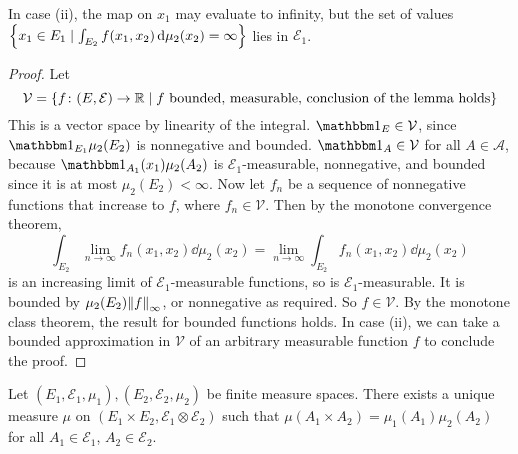 \begin{remark}
	In case (ii), the map on \( x_1 \) may evaluate to infinity, but the set of values \( \qty{x_1 \in E_1 \mid \int_{E_2} f(x_1,x_2) \dd{\mu_2(x_2)} = \infty} \) lies in \( \mathcal E_1 \).
\end{remark}
\begin{proof}
	Let
	\[ \mathcal V = \qty{f \colon (E,\mathcal E) \to \mathbb R \mid f \text{ bounded, measurable, conclusion of the lemma holds}} \]
	This is a vector space by linearity of the integral.
	\( \mathbbm 1_E \in \mathcal V \), since \( \mathbbm 1_{E_1} \mu_2(E_2) \) is nonnegative and bounded.
	\( \mathbbm 1_A \in \mathcal V \) for all \( A \in \mathcal A \), because \( \mathbbm 1_{A_1}(x_1) \mu_2(A_2) \) is \( \mathcal E_1 \)-measurable, nonnegative, and bounded since it is at most \( \mu_2(E_2) < \infty \).
	Now let \( f_n \) be a sequence of nonnegative functions that increase to \( f \), where \( f_n \in \mathcal V \).
	Then by the monotone convergence theorem,
	\[ \int_{E_2} \lim_{n \to \infty} f_n(x_1, x_2) \dd{\mu_2(x_2)} = \lim_{n \to \infty} \int_{E_2} f_n(x_1, x_2) \dd{\mu_2(x_2)} \]
	is an increasing limit of \( \mathcal E_1 \)-measurable functions, so is \( \mathcal E_1 \)-measurable.
	It is bounded by \( \mu_2(E_2) \norm{f}_\infty \), or nonnegative as required.
	So \( f \in \mathcal V \).
	By the monotone class theorem, the result for bounded functions holds.
	In case (ii), we can take a bounded approximation in \( \mathcal V \) of an arbitrary measurable function \( f \) to conclude the proof.
\end{proof}
\begin{theorem}
	Let \( (E_1, \mathcal E_1, \mu_1), (E_2, \mathcal E_2, \mu_2) \) be finite measure spaces.
	There exists a unique measure \( \mu \) on \( (E_1 \times E_2, \mathcal E_1 \otimes \mathcal E_2) \) such that \( \mu(A_1 \times A_2) = \mu_1(A_1) \mu_2(A_2) \) for all \( A_1 \in \mathcal E_1 \), \( A_2 \in \mathcal E_2 \).
\end{theorem}
